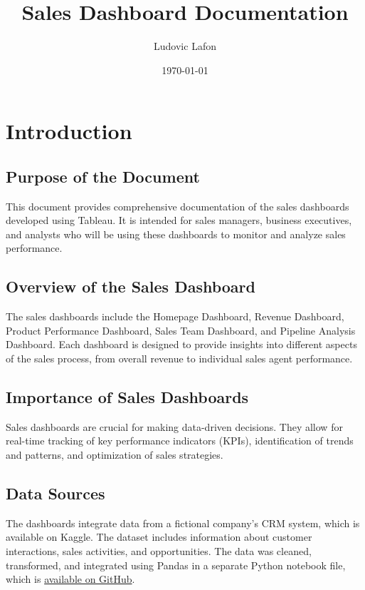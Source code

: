 \documentclass{article}
\title{Sales Dashboard Documentation}
\author{Ludovic Lafon}
\date{\today}
\begin{document}
\maketitle
\tableofcontents
\clearpage %

\section{Introduction}

\subsection{Purpose of the Document}
This document provides comprehensive documentation of the sales dashboards developed using Tableau. It is intended for sales managers, business executives, and analysts who will be using these dashboards to monitor and analyze sales performance.

\subsection{Overview of the Sales Dashboard}
The sales dashboards include the Homepage Dashboard, Revenue Dashboard, Product Performance Dashboard, Sales Team Dashboard, and Pipeline Analysis Dashboard. Each dashboard is designed to provide insights into different aspects of the sales process, from overall revenue to individual sales agent performance.

\subsection{Importance of Sales Dashboards}
Sales dashboards are crucial for making data-driven decisions. They allow for real-time tracking of key performance indicators (KPIs), identification of trends and patterns, and optimization of sales strategies.

\subsection{Data Sources}
The dashboards integrate data from a fictional company's CRM system, which is available on Kaggle. The dataset includes information about customer interactions, sales activities, and opportunities. The data was cleaned, transformed, and integrated using Pandas in a separate Python notebook file, which is  \href{[https://github.com/LAlto96/sales-analytics-dashboard]}{available on GitHub}.
\end{document}
